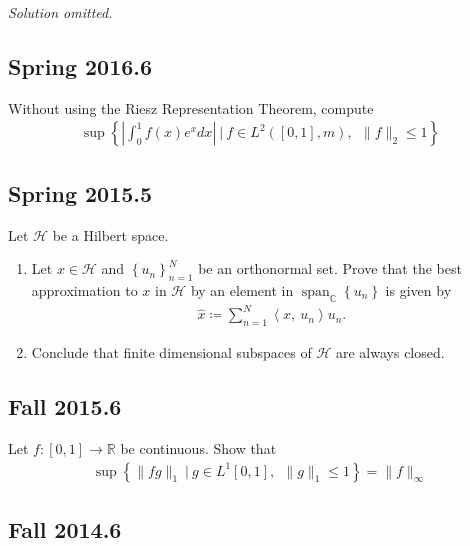 \emph{Solution omitted.}

\hypertarget{spring-2016.6}{%
\subsection{Spring 2016.6}\label{spring-2016.6}}

Without using the Riesz Representation Theorem, compute
\begin{align*}
\sup \left\{\left|\int_{0}^{1} f(x) e^{x} d x\right| {~\mathrel{\Big\vert}~}f \in L^{2}([0,1], m),~~ \|f\|_{2} \leq 1\right\}
\end{align*}

\hypertarget{spring-2015.5}{%
\subsection{Spring 2015.5}\label{spring-2015.5}}

Let \(\mathcal H\) be a Hilbert space.

\begin{enumerate}
\def\labelenumi{\arabic{enumi}.}
\tightlist
\item
  Let \(x\in \mathcal H\) and \(\left\{{u_n}\right\}_{n=1}^N\) be an
  orthonormal set. Prove that the best approximation to \(x\) in
  \(\mathcal H\) by an element in
  \(\mathop{\mathrm{span}}_{\mathbb{C}}\left\{{u_n}\right\}\) is given
  by
  \begin{align*}
    \widehat{x} \coloneqq\sum_{n=1}^N {\left\langle {x},~{u_n} \right\rangle}u_n.
    \end{align*}
\item
  Conclude that finite dimensional subspaces of \(\mathcal H\) are
  always closed.
\end{enumerate}

\hypertarget{fall-2015.6}{%
\subsection{Fall 2015.6}\label{fall-2015.6}}

Let \(f: [0, 1] \to {\mathbb{R}}\) be continuous. Show that
\begin{align*}
\sup \left\{\|f g\|_{1} {~\mathrel{\Big\vert}~}g \in L^{1}[0,1],~~ \|g\|_{1} \leq 1\right\}=\|f\|_{\infty}
\end{align*}

\hypertarget{fall-2014.6}{%
\subsection{Fall 2014.6}\label{fall-2014.6}}

